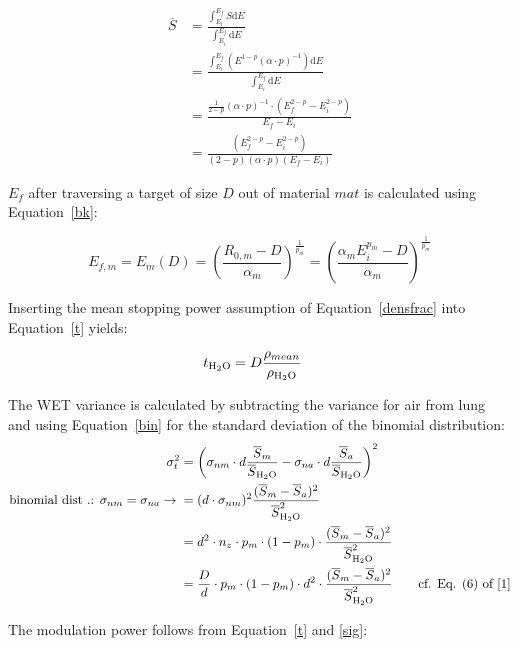 \documentclass{article}
\begin{document}
\begin{align}
    \label{meanS}
    \overline{S} &= \frac{\int^{E_f}_{E_i}S\text{d}E}{\int^{E_f}_{E_i}\text{d}E} \\
    &= \frac{\int^{E_f}_{E_i} (E^{1-p} (\alpha \cdot p)^{-1}) \text{d}E}{\int^{E_f}_{E_i}\text{d}E} \\
    &= \frac{\frac{1}{2-p}(\alpha \cdot p)^{-1}\cdot (E_f^{2-p}-E_i^{2-p})}{E_f-E_i} \\
    &= \frac{(E_f^{2-p}-E_i^{2-p})}{(2-p)(\alpha \cdot p)(E_f-E_i)}
\end{align}

$E_f$ after traversing a target of size $D$ out of material $mat$ is calculated using Equation~\ref{bk}:

\begin{equation}
\label{ef}
    E_{f,m} = E_m(D) = \left(\frac{R_{0,m}-D}{\alpha_m}\right)^{\frac{1}{p_m}} = \left(\frac{\alpha_m E_i^{p_m}-D}{\alpha_m}\right)^{\frac{1}{p_m}}
\end{equation}

Inserting the mean stopping power assumption of Equation~\ref{densfrac} into Equation~\ref{t} yields:

\begin{align}
    t_{\ce{H2O}} &= D \frac{\rho_{mean}}{\rho_{\ce{H2O}}}
\end{align}

The WET variance is calculated by subtracting the variance for air from lung and using Equation~\ref{bin} for the standard deviation of the binomial distribution:
\begin{align}
\label{sig}
    \sigma_{t}^2&= \left(\sigma_{nm} \cdot d \frac{\overline{S}_m}{\overline{S}_{\ce{H2O}}}-\sigma_{na} \cdot d \frac{\overline{S}_a}{\overline{S}_{\ce{H2O}}}\right)^2\\
    \text{binomial dist
    .: } \sigma_{nm} = \sigma_{na} \rightarrow{} &=   (d\cdot \sigma_{nm})^2 \frac{(\overline{S}_m-\overline{S}_a)^2}{\overline{S}_{\ce{H2O}}^2} \\
    &=   d^2 \cdot n_z \cdot p_m \cdot (1-p_m) \cdot \frac{(\overline{S}_m-\overline{S}_a)^2}{\overline{S}_{\ce{H2O}}^2} \\
    &=   \frac{D}{d} \cdot p_m\cdot (1-p_m)\cdot d^2\cdot \frac{(\overline{S}_m-\overline{S}_a)^2}{\overline{S}_{\ce{H2O}}^2} \qquad \text{cf. Eq. (6) of [1]}
\end{align}

The modulation power follows from Equation~\ref{t} and \ref{sig}:
\end{document}
